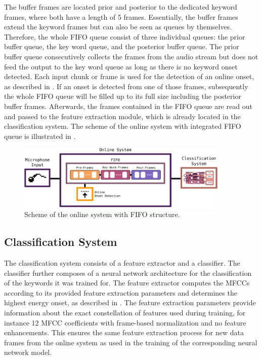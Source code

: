 The buffer frames are located prior and posterior to the dedicated keyword frames, where both have a length of 5 frames.
Essentially, the buffer frames extend the keyword frames but can also be seen as queues by themselves.
Therefore, the whole FIFO queue consist of three individual queues: the prior buffer queue, the key word queue, and the posterior buffer queue.
The prior buffer queue consecutively collects the frames from the audio stream but does not feed the output to the key word queue as long as there is no keyword onset detected.
Each input chunk or frame is used for the detection of an online onset, as described in .
If an onset is detected from one of those frames, subsequently the whole FIFO queue will be filled up to its full size including the posterior buffer frames.
Afterwards, the frames contained in the FIFO queue are read out and passed to the feature extraction module, which is already located in the classification system.
The scheme of the online system with integrated FIFO queue is illustrated in .
\begin{figure}[!ht]
  \centering
  \includegraphics[width=0.9\textwidth]{./6_game/figs/game_system_online.pdf}
  \caption{Scheme of the online system with FIFO structure.}
  \label{fig:game_system_online}
\end{figure}
\FloatBarrier
\noindent



\subsection{Classification System}
The classification system consists of a feature extractor and a classifier.
The classifier further composes of a neural network architecture for the classification of the keywords it was trained for.
The feature extractor computes the MFCCs according to its provided feature extraction parameters and determines the highest energy onset, as described in .
The feature extraction parameters provide information about the exact constellation of features used during training, for instance 12 MFCC coefficients with frame-based normalization and no feature enhancements.
This ensures the same feature extraction process for new data frames from the online system as used in the training of the corresponding neural network model.

